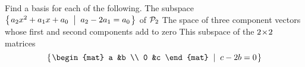 
\begin{Exercise}[
name={},
title={}, 
difficulty=0,
origin={\cite{JH}}]
Find a basis for each of the following.
\Question The subspace $\mbox{$\left\{\hspace{0.1em}a_2x^2+a_1x+a_0\;\;\middle|\;\; a_2-2a_1=a_0\hspace{0.1em}\right\}$}$ 
          of $\mathcal{P}_2$
\Question The space of three component vectors whose first and second
          components add to zero
\Question This subspace of the $2 \! \times \! 2$ matrices
          \begin{equation*}
            \set{\begin{mat}
                   a  &b  \\
                   0  &c  
                 \end{mat} \suchthat c-2b=0}
          \end{equation*}

\end{Exercise}

